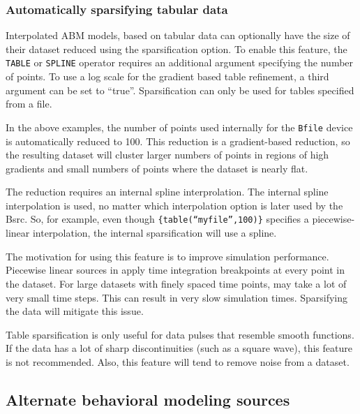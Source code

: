 \subsubsection{Automatically sparsifying tabular data}

Interpolated ABM models, based on tabular data can optionally have the size of their 
dataset reduced using the sparsification option.  To enable this feature, the \texttt{TABLE} 
or \texttt{SPLINE} operator requires an additional argument specifying the number of points.  
To use a log scale for the gradient based table refinement, a third argument can be set to ``true''.
Sparsification can only be used for tables specified from a file.


In the above examples, the number of points used internally for the 
\texttt{Bfile} device is automatically reduced to 100.  This 
reduction is a gradient-based reduction, 
so the resulting dataset will cluster larger numbers of points in regions of 
high gradients and small numbers of points where the dataset is nearly flat.

The reduction requires an internal spline interprolation.  The internal spline 
interpolation is used, no matter which interpolation option is later used by 
the Bsrc.  So, for example, even though \texttt{\{table(``myfile'',100)\}} 
specifies a piecewise-linear interpolation, the internal sparsification will 
use a spline.

The motivation for using this feature is to improve simulation performance.  
Piecewise linear sources in \Xyce{} apply time integration breakpoints at every point in the dataset.
For large datasets with finely spaced time points, \Xyce{} may take a lot of very small time steps.
This can result in very slow simulation times.  Sparsifying the data will mitigate this issue.

Table sparsification is only useful for data pulses that resemble smooth functions.   
If the data has a lot of sharp discontinuities (such as a square wave), 
this feature is not recommended. Also, this feature will tend to remove noise 
from a dataset.

\subsection{Alternate behavioral modeling sources}

